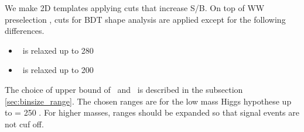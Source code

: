 We make 2D templates applying cuts that increase S/B. 
On top of WW preselection \cite{HWW2012ICHEP}, cuts for BDT shape analysis are applied 
except for the following differences. 

\begin{itemize}
	\item \mt~is relaxed up to 280 \GeV
	\item \mll~is relaxed up to 200 \GeV  
\end{itemize}

The choice of upper bound of \mt~and \mll~is described in the subsection \ref{sec:binsize_range}. 
The chosen ranges are for the low mass Higgs hypothese up to \mHi = 250 \GeV. For higher masses, 
ranges should be expanded so that signal events are not cuf off. 

